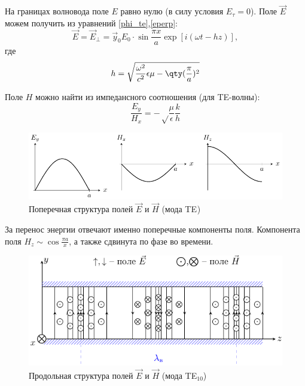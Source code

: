 На границах волновода поле $E$ равно нулю (в силу условия $E_\tau=0$). Поле $\vec{E}$ можем получить из уравнений \eqref{phi_te},\eqref{eperp}:
\begin{equation}
	\vec{E}=\vec{E}_\perp=\vec{y}_0E_0\cdot\sin\frac{\pi x}{a}\exp[i(\omega t - hz)],
\end{equation}
где 
\begin{equation}
	h=\sqrt{
		\frac{\omega^2}{c^2}\epsilon \mu - \qty(\frac{\pi}{a})^2
	}
\end{equation}

Поле $H$ можно найти из импедансного соотношения (для TE-волны):
\begin{equation}
	\frac{E_y}{H_x}=-\sqrt\frac{\mu}{\epsilon}\frac{k}{h}
\end{equation}

\begin{figure}[H]
	\centering
	\includegraphics[width=\textwidth]{img/lect4_ris9}
	\caption{Поперечная структура полей $\vec{E}$ и $\vec{H}$ (мода TE$_{}$)}
	\vspace{-1em}
	\label{fig:lect4:9}
\end{figure}

За перенос энергии отвечают именно поперечные компоненты поля. Компонента поля
$H_z \sim \cos\frac{\pi a}{x}$, а также сдвинута по фазе во времени. 

\begin{figure}[H]
	\centering
	\includegraphics[width=\textwidth]{img/lect4_ris10}
	\vspace{-1em}
	\caption{Продольная структура полей $\vec{E}$ и $\vec{H}$ (мода TE$_{10}$)}
	\label{fig:lect4:10}
\end{figure}

